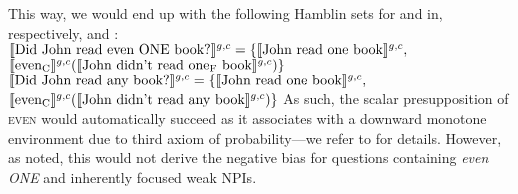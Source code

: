\xe
\ex{} 
\xe
This way, we would end up with the following Hamblin sets for  and  in, respectively,  and :
\ex{}
$\intension[g,c]{Did John read even \MakeUppercase{one} book?}=\{\intension[g,c]{John read one book},$\\\emptyfill$\intension[g,c]{even\textsubscript{C}}(\intension[g,c]{John didn't read one\textsubscript{F} book})\}$
\xe
\ex{}
$\intension[g,c]{Did John read any book?}=\{\intension[g,c]{John read one book},$\\\emptyfill$\intension[g,c]{even\textsubscript{C}}(\intension[g,c]{John didn't read any book})\}$
\xe
As such, the scalar presupposition of {\scshape even} would automatically succeed as it associates with a downward monotone environment due to  third axiom of probability---we refer to  for details. However, as \textcite{Crnic2014-dogma,Crnic2014-nm} noted, this would not derive the negative bias for questions containing \textit{even \MakeUppercase{one}} and inherently focused weak NPIs.

